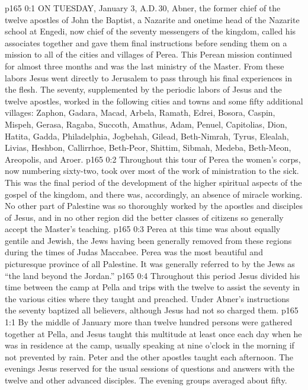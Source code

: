 \vs p165 0:1 ON TUESDAY, January 3, A.D.\,30, Abner, the former chief of the twelve apostles of John the Baptist, a Nazarite and onetime head of the Nazarite school at Engedi, now chief of the seventy messengers of the kingdom, called his associates together and gave them final instructions before sending them on a mission to all of the cities and villages of Perea. This Perean mission continued for almost three months and was the last ministry of the Master. From these labors Jesus went directly to Jerusalem to pass through his final experiences in the flesh. The seventy, supplemented by the periodic labors of Jesus and the twelve apostles, worked in the following cities and towns and some fifty additional villages: Zaphon, Gadara, Macad, Arbela, Ramath, Edrei, Bosora, Caspin, Mispeh, Gerasa, Ragaba, Succoth, Amathus, Adam, Penuel, Capitolias, Dion, Hatita, Gadda, Philadelphia, Jogbehah, Gilead, Beth\hyp{}Nimrah, Tyrus, Elealah, Livias, Heshbon, Callirrhoe, Beth\hyp{}Peor, Shittim, Sibmah, Medeba, Beth\hyp{}Meon, Areopolis, and Aroer.
\vs p165 0:2 Throughout this tour of Perea the women’s corps, now numbering sixty\hyp{}two, took over most of the work of ministration to the sick. This was the final period of the development of the higher spiritual aspects of the gospel of the kingdom, and there was, accordingly, an absence of miracle working. No other part of Palestine was so thoroughly worked by the apostles and disciples of Jesus, and in no other region did the better classes of citizens so generally accept the Master’s teaching.
\vs p165 0:3 Perea at this time was about equally gentile and Jewish, the Jews having been generally removed from these regions during the times of Judas Maccabee. Perea was the most beautiful and picturesque province of all Palestine. It was generally referred to by the Jews as “the land beyond the Jordan.”
\vs p165 0:4 Throughout this period Jesus divided his time between the camp at Pella and trips with the twelve to assist the seventy in the various cities where they taught and preached. Under Abner’s instructions the seventy baptized all believers, although Jesus had not so charged them.
\vs p165 1:1 By the middle of January more than twelve hundred persons were gathered together at Pella, and Jesus taught this multitude at least once each day when he was in residence at the camp, usually speaking at nine o’clock in the morning if not prevented by rain. Peter and the other apostles taught each afternoon. The evenings Jesus reserved for the usual sessions of questions and answers with the twelve and other advanced disciples. The evening groups averaged about fifty.
